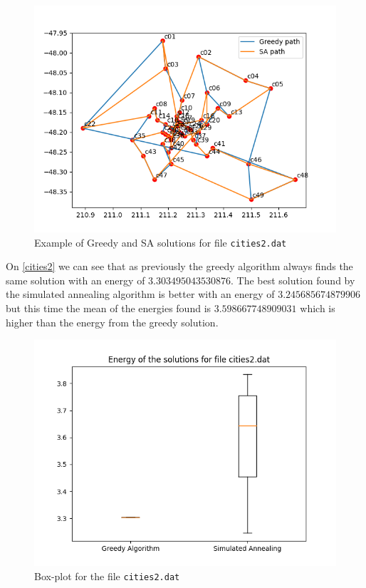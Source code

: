 \documentclass[14pt]
{article}
\begin{document}
\begin{figure}[H] 
\center
\includegraphics[scale=0.5]{img/cities2.png}
\caption{Example of Greedy and SA solutions for file \texttt{cities2.dat}}
\end{figure}

On \autoref{cities2} we can see that as previously the greedy algorithm always finds the same solution with an energy of $3.303495043530876$. The best solution found by the simulated annealing algorithm is better with an energy of $3.245685674879906$ but this time the mean of the energies found is $3.598667748909031$ which is higher than the energy from the greedy solution.
\newpage

\begin{figure}[H] 
\center
\includegraphics[scale=0.5]{img/box_cities2.png}
\caption{\label{cities2} Box-plot for the file \texttt{cities2.dat}}
\end{figure}
\end{document}
